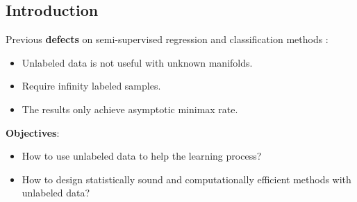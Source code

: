 \documentclass[a0,landscape]{a0poster}
\begin{document}
\vspace{1cm} %


\begin{multicols}{4} %


\color{black} %

\section*{Introduction}
Previous \textbf{defects} on semi-supervised regression and classification methods \cite{semi1}\cite{semi2}:
\begin{itemize}
    \item Unlabeled data is not useful with unknown manifolds.
    \item Require infinity labeled samples.
    \item The results only achieve asymptotic minimax rate.
\end{itemize}
\textbf{Objectives}:
\begin{itemize}
    \item How to use unlabeled data to help the learning process?
    \item How to design statistically sound and computationally efficient methods with unlabeled data?
\end{itemize}



\color{Navy} %

\end{multicols}
\end{document}
